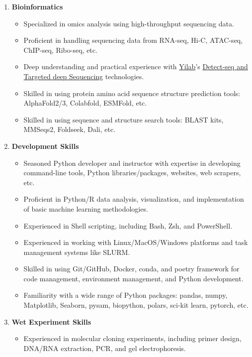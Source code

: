 \begin{enumerate}
    \item \textbf{Bioinformatics}
    \begin{itemize}
        \item Specialized in omics analysis using high-throughput sequencing data.
        \item Proficient in handling sequencing data from RNA-seq, Hi-C, ATAC-seq, ChIP-seq, Ribo-seq, etc.
        \item Deep understanding and practical experience with \href{https://yilab.org.cn/}{Yilab}'s \href{https://www.nature.com/articles/s41586-022-04836-5}{Detect-seq and Targeted deep Sequencing} technologies.
        \item Skilled in using protein amino acid sequence structure prediction tools: AlphaFold2/3, Colabfold, ESMFold, etc.
        \item Skilled in using sequence and structure search tools: BLAST kits, MMSeqs2, Foldseek, Dali, etc.
    \end{itemize}
    \item \textbf{Development Skills}
    \begin{itemize}
        \item Seasoned Python developer and instructor with expertise in developing 
        command-line tools, Python libraries/packages, websites, web scrapers, etc.
        \item Proficient in Python/R data analysis, visualization, and implementation of basic machine learning methodologies.
        \item Experienced in Shell scripting, including Bash, Zsh, and PowerShell.
        \item Experienced in working with Linux/MacOS/Windows platforms and task management systems like SLURM.
        \item Skilled in using Git/GitHub, Docker, conda, and poetry framework for code management, environment management, and Python development.
        \item Familiarity with a wide range of Python packages: pandas, numpy, Matplotlib, Seaborn, pysam, biopython, polars, sci-kit learn, pytorch, etc.
    \end{itemize}
    \item \textbf{Wet Experiment Skills}
    \begin{itemize}
        \item Experienced in molecular cloning experiments, including primer design, DNA/RNA extraction, PCR, and gel electrophoresis.

\end{itemize}
\end{enumerate}
